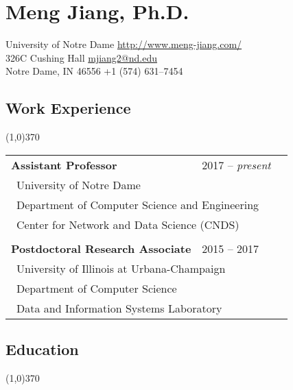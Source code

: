 \documentclass[10pt]{article}
\begin{document}
\setcounter{secnumdepth}{0}

\thispagestyle{firststyle}

\section{\LARGE{\sc Meng Jiang, Ph.D.}}
University of Notre Dame \hfill \url{http://www.meng-jiang.com/} \\
326C Cushing Hall \hfill \url{mjiang2@nd.edu}\\
Notre Dame, IN 46556 \hfill +1 (574) 631--7454

\subsection{\sc Work Experience}
\vspace{-0.4cm} \line(1,0){370} \vspace{0.1cm}

\begin{table}[h!]
\begin{tabular*}{12.7cm}{p{10.0cm}p{3.25cm}r}
\bf{Assistant Professor}&2017 -- \textit{present}\\
 \multicolumn{2}{l}{~{University of Notre Dame}}\\
 \multicolumn{2}{l}{~{Department of Computer Science and Engineering}}\\
 \multicolumn{2}{l}{~{Center for Network and Data Science (CNDS)}}\\
\\
\bf{Postdoctoral Research Associate}&2015 -- 2017\\
 \multicolumn{2}{l}{~{University of Illinois at Urbana-Champaign}}\\
 \multicolumn{2}{l}{~{Department of Computer Science}}\\
 \multicolumn{2}{l}{~{Data and Information Systems Laboratory}}
\end{tabular*}
\end{table}
\vspace{-0.4cm}

\vspace{-0.2cm}
\subsection{\sc Education}
\vspace{-0.4cm} \line(1,0){370} \vspace{-0.1cm}
\end{document}
